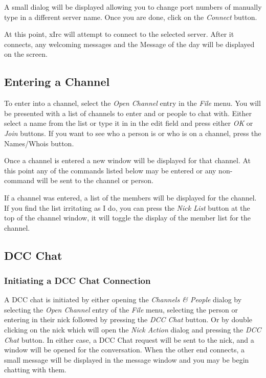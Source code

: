 \documentclass[titlepage]{article}
\begin{document}
A small dialog will be displayed allowing you to change port numbers of
manually type in a different server name. Once you are done, click on the
\emph{Connect} button.

At this point, xIrc will attempt to connect to the selected server. After
it connects, any welcoming messages and the Message of the day will be
displayed on the screen.

\subsection{Entering a Channel}
To enter into a channel, select the \emph{Open Channel} entry in the
\emph{File} menu. You will be presented with a list of channels to enter and or
people to chat with. Either select a name from the list or type it in in
the edit field and press either \emph{OK} or \emph{Join} buttons. If you
want to see who a person is or who is on a channel, press the {Names/Whois}
button.

Once a channel is entered a new window will be displayed for that channel.
At this point any of the commands listed below may be entered or any
non-command will be sent to the channel or person.

If a channel was entered, a list of the members will be displayed for the
channel. If you find the list irritating as I do, you can press the
\emph{Nick List} button at the top of the channel window, it will toggle
the display of the member list for the channel.

\subsection{DCC Chat}
\subsubsection{Initiating a DCC Chat Connection}
A DCC chat is initiated by either opening the \emph{Channels \& People}
dialog by selecting the \emph{Open Channel} entry of the \emph{File} menu,
selecting the person or entering in their nick followed by pressing the
\emph{DCC Chat} button. Or by double clicking on the nick which will open
the \emph{Nick Action} dialog and pressing the \emph{DCC Chat} button. In
either case, a DCC Chat request will be sent to the nick, and a window will
be opened for the conversation. When the other end connects, a small
message will be displayed in the message window and you may be begin
chatting with them.
\end{document}
